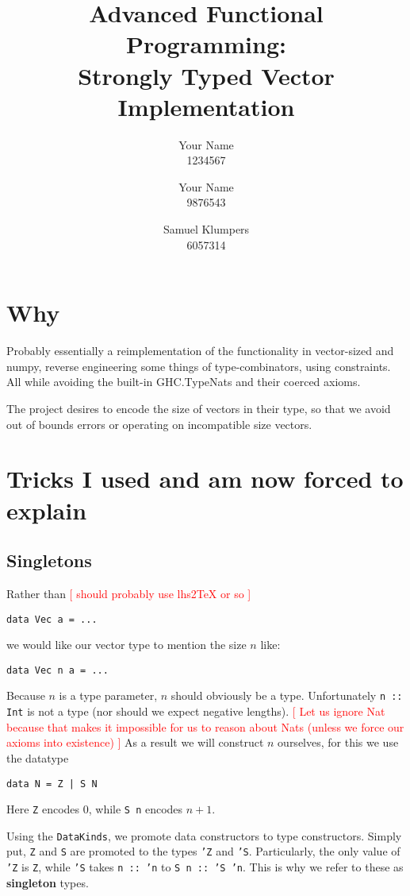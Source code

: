 \documentclass{article}
\title{Advanced Functional Programming:\\ Strongly Typed Vector Implementation}
\author{Your Name\\1234567 \and%
        Your Name\\9876543 \and%
        Samuel Klumpers\\6057314}
\newcommand{\rem}[1]{\textcolor{red}{[ #1 ]}}
\begin{document}
    \maketitle

    \section{Why}
    Probably essentially a reimplementation of the functionality in vector-sized and numpy,
    reverse engineering some things of type-combinators, using constraints.
    All while avoiding the built-in GHC.TypeNats and their coerced axioms.

    The project desires to encode the size of vectors in their type,
    so that we avoid out of bounds errors or operating on incompatible size vectors.

    \section{Tricks I used and am now forced to explain}
    \subsection{Singletons}
    Rather than
    \rem{should probably use lhs2TeX or so}
\begin{verbatim} 
data Vec a = ...
\end{verbatim}
we would like our vector type to mention the size $n$ like:
\begin{verbatim} 
data Vec n a = ...
\end{verbatim}

    Because $n$ is a type parameter, $n$ should obviously be a type.
    Unfortunately \texttt{n :: Int} is not a type (nor should we expect negative lengths).
    \rem{Let us ignore Nat because that makes it impossible for us to reason about Nats (unless we force our axioms into existence)} 
    As a result we will construct $n$ ourselves, for this we use the datatype
\begin{verbatim}
data N = Z | S N
\end{verbatim}
    Here \texttt{Z} encodes 0, while \texttt{S n} encodes $n + 1$.

    Using the \texttt{DataKinds}, we promote data constructors to type constructors.
    Simply put, \texttt{Z} and \texttt{S} are promoted to the types \texttt{'Z} and \texttt{'S}.
    Particularly, the only value of \texttt{'Z} is \texttt{Z},
    while \texttt{'S} takes \texttt{n :: 'n} to \texttt{S n :: 'S 'n}.
    This is why we refer to these as \textbf{singleton} types.
\end{document}
